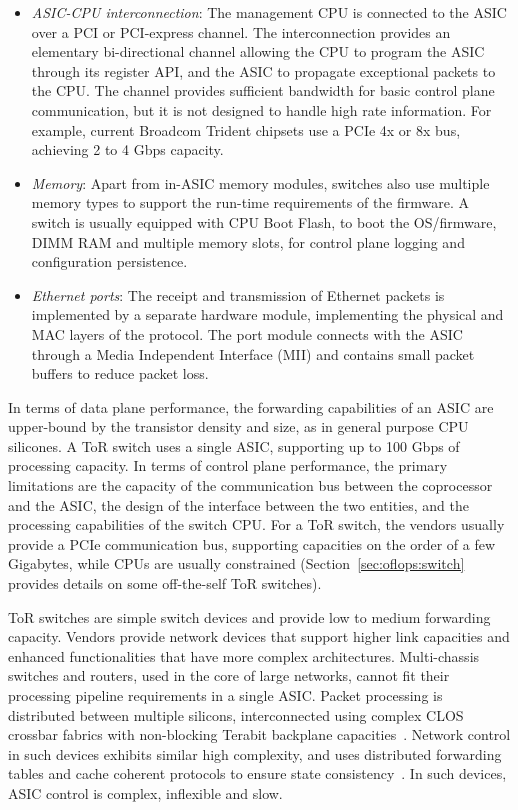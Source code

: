 \begin{itemize}
  \item \emph{ASIC-CPU interconnection}: The management CPU is connected to the ASIC
    over a PCI or PCI-express channel. The interconnection provides an
    elementary bi-directional channel allowing the CPU to program the ASIC
    through its register API, and the ASIC to propagate exceptional packets to
    the CPU\@. The channel provides sufficient bandwidth for basic control plane
    communication, but it is not designed to handle high rate information. For
    example, current Broadcom Trident chipsets use a PCIe 4x or 8x bus,
    achieving 2 to 4 Gbps capacity.  

  \item \emph{Memory}: Apart from in-ASIC memory modules, switches
    also use multiple memory types to support the run-time requirements of the
    firmware. A switch is usually equipped with CPU Boot Flash, to boot the
    OS/firmware, DIMM RAM and multiple memory slots, for control plane logging
    and configuration persistence.

  \item \emph{Ethernet ports}: The receipt and transmission of Ethernet packets
    is implemented by a separate hardware module, 
    implementing the physical and MAC layers of the protocol. The port module 
    connects with the  ASIC through a Media Independent Interface (MII) and
    contains small packet buffers to reduce packet loss.  
\end{itemize}

In terms of data plane performance,  the forwarding capabilities of an ASIC are
upper-bound by the transistor density and size, as in general purpose CPU
silicones. A ToR switch uses a single ASIC, supporting up to 100 Gbps of processing
capacity.  In terms of control plane performance, the primary limitations are the
capacity of the communication bus between the coprocessor and the ASIC, the
design of the interface between the two entities, and the processing capabilities
of the switch CPU\@.  For a ToR switch, the vendors usually provide a PCIe
communication bus, supporting capacities on the order of a few Gigabytes, while
CPUs are usually constrained (Section~\ref{sec:oflops:switch} provides details
on some off-the-self ToR switches).

ToR switches are simple switch devices and provide low to medium forwarding
capacity. Vendors provide network devices that support higher link capacities and
enhanced functionalities that have more complex architectures. Multi-chassis
switches and routers, used in the core of large networks, cannot fit their
processing pipeline requirements in a single ASIC\@.  Packet processing is
distributed between multiple silicons, interconnected using complex CLOS
crossbar fabrics with non-blocking Terabit backplane
capacities~. Network control in such devices exhibits
similar high complexity, and uses distributed forwarding tables and cache
coherent protocols to ensure state consistency~. In such
devices, ASIC control is complex, inflexible and slow.  

